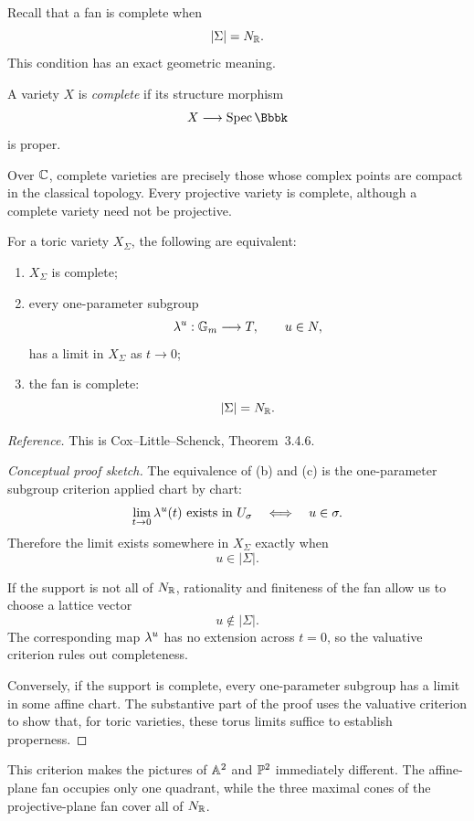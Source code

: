 Recall that a fan is complete when
\[
|\Sigma|=N_{\mathbb{R}}.
\]
This condition has an exact geometric meaning.

\begin{agcheatsheet}
A variety \(X\) is \emph{complete} if its structure morphism
\[
X\longrightarrow\Spec\Bbbk
\]
is proper.

Over \(\mathbb{C}\), complete varieties are precisely those whose complex
points are compact in the classical topology. Every projective variety
is complete, although a complete variety need not be projective.
\end{agcheatsheet}

\begin{theorem}
\label{thm:completeness-criterion-fan}
For a toric variety \(X_\Sigma\), the following are equivalent:
\begin{enumerate}[label=(\alph*),wide=0pt]
\item \(X_\Sigma\) is complete;
\item every one-parameter subgroup
\[
\lambda^{u}:\mathbb{G}_{m}\longrightarrow T,
\qquad
u\in N,
\]
has a limit in \(X_\Sigma\) as \(t\to0\);
\item the fan is complete:
\[
|\Sigma|=N_{\mathbb{R}}.
\]
\end{enumerate}
\end{theorem}

\noindent
\textit{Reference.}
This is Cox--Little--Schenck, Theorem~3.4.6.

\begin{proof}[Conceptual proof sketch]
The equivalence of (b) and (c) is the one-parameter subgroup
criterion applied chart by chart:
\[
\lim_{t\to0}\lambda^{u}(t)\text{ exists in }U_\sigma
\quad\Longleftrightarrow\quad
u\in\sigma.
\]
Therefore the limit exists somewhere in \(X_\Sigma\) exactly when
\[
u\in|\Sigma|.
\]

If the support is not all of \(N_{\mathbb{R}}\), rationality and finiteness
of the fan allow us to choose a lattice vector
\[
u\notin|\Sigma|.
\]
The corresponding map \(\lambda^{u}\) has no extension across \(t=0\),
so the valuative criterion rules out completeness.

Conversely, if the support is complete, every one-parameter subgroup
has a limit in some affine chart. The substantive part of the proof
uses the valuative criterion to show that, for toric varieties, these
torus limits suffice to establish properness.
\end{proof}

This criterion makes the pictures of \(\mathbb{A}^2\) and \(\mathbb{P}^2\)
immediately different. The affine-plane fan occupies only one
quadrant, while the three maximal cones of the projective-plane fan
cover all of \(N_{\mathbb{R}}\).

